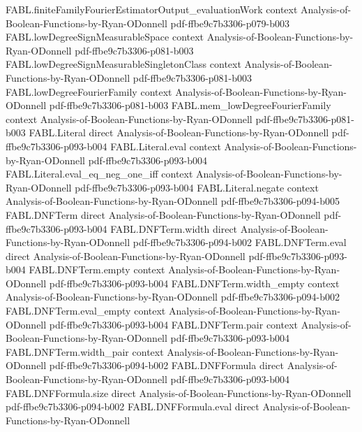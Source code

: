 \begin{theorem}
\proofstep
  {FABL.finiteFamilyFourierEstimatorOutput_evaluationWork}
  {context}
  {Analysis-of-Boolean-Functions-by-Ryan-ODonnell}
  {pdf-ffbe9c7b3306-p079-b003}
\proofstep
  {FABL.lowDegreeSignMeasurableSpace}
  {context}
  {Analysis-of-Boolean-Functions-by-Ryan-ODonnell}
  {pdf-ffbe9c7b3306-p081-b003}
\proofstep
  {FABL.lowDegreeSignMeasurableSingletonClass}
  {context}
  {Analysis-of-Boolean-Functions-by-Ryan-ODonnell}
  {pdf-ffbe9c7b3306-p081-b003}
\proofstep
  {FABL.lowDegreeFourierFamily}
  {context}
  {Analysis-of-Boolean-Functions-by-Ryan-ODonnell}
  {pdf-ffbe9c7b3306-p081-b003}
\proofstep
  {FABL.mem_lowDegreeFourierFamily}
  {context}
  {Analysis-of-Boolean-Functions-by-Ryan-ODonnell}
  {pdf-ffbe9c7b3306-p081-b003}
\proofstep
  {FABL.Literal}
  {direct}
  {Analysis-of-Boolean-Functions-by-Ryan-ODonnell}
  {pdf-ffbe9c7b3306-p093-b004}
\proofstep
  {FABL.Literal.eval}
  {context}
  {Analysis-of-Boolean-Functions-by-Ryan-ODonnell}
  {pdf-ffbe9c7b3306-p093-b004}
\proofstep
  {FABL.Literal.eval_eq_neg_one_iff}
  {context}
  {Analysis-of-Boolean-Functions-by-Ryan-ODonnell}
  {pdf-ffbe9c7b3306-p093-b004}
\proofstep
  {FABL.Literal.negate}
  {context}
  {Analysis-of-Boolean-Functions-by-Ryan-ODonnell}
  {pdf-ffbe9c7b3306-p094-b005}
\proofstep
  {FABL.DNFTerm}
  {direct}
  {Analysis-of-Boolean-Functions-by-Ryan-ODonnell}
  {pdf-ffbe9c7b3306-p093-b004}
\proofstep
  {FABL.DNFTerm.width}
  {direct}
  {Analysis-of-Boolean-Functions-by-Ryan-ODonnell}
  {pdf-ffbe9c7b3306-p094-b002}
\proofstep
  {FABL.DNFTerm.eval}
  {direct}
  {Analysis-of-Boolean-Functions-by-Ryan-ODonnell}
  {pdf-ffbe9c7b3306-p093-b004}
\proofstep
  {FABL.DNFTerm.empty}
  {context}
  {Analysis-of-Boolean-Functions-by-Ryan-ODonnell}
  {pdf-ffbe9c7b3306-p093-b004}
\proofstep
  {FABL.DNFTerm.width_empty}
  {context}
  {Analysis-of-Boolean-Functions-by-Ryan-ODonnell}
  {pdf-ffbe9c7b3306-p094-b002}
\proofstep
  {FABL.DNFTerm.eval_empty}
  {context}
  {Analysis-of-Boolean-Functions-by-Ryan-ODonnell}
  {pdf-ffbe9c7b3306-p093-b004}
\proofstep
  {FABL.DNFTerm.pair}
  {context}
  {Analysis-of-Boolean-Functions-by-Ryan-ODonnell}
  {pdf-ffbe9c7b3306-p093-b004}
\proofstep
  {FABL.DNFTerm.width_pair}
  {context}
  {Analysis-of-Boolean-Functions-by-Ryan-ODonnell}
  {pdf-ffbe9c7b3306-p094-b002}
\proofstep
  {FABL.DNFFormula}
  {direct}
  {Analysis-of-Boolean-Functions-by-Ryan-ODonnell}
  {pdf-ffbe9c7b3306-p093-b004}
\proofstep
  {FABL.DNFFormula.size}
  {direct}
  {Analysis-of-Boolean-Functions-by-Ryan-ODonnell}
  {pdf-ffbe9c7b3306-p094-b002}
\proofstep
  {FABL.DNFFormula.eval}
  {direct}
  {Analysis-of-Boolean-Functions-by-Ryan-ODonnell}

\end{theorem}
